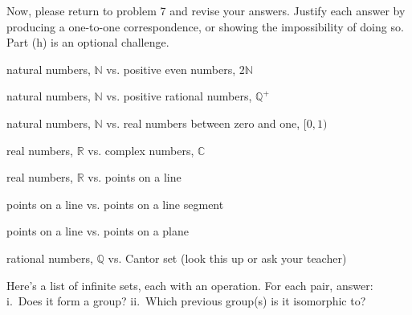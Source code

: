 \documentclass[../gatm_answers.tex]{subfiles}
\begin{document}
\begin{outer_problem}
\item Now, please return to problem 7 and revise your answers. Justify each answer by producing a one-to-one correspondence, or showing the impossibility of doing so. Part (h) is an optional challenge.
\end{outer_problem}

\begin{inner_problem}[start=1]
\item natural numbers, $\mathbb{N}$ vs. positive even numbers, $2\mathbb{N}$
\end{inner_problem}

\begin{inner_problem}
\item natural numbers, $\mathbb{N}$ vs. positive rational numbers, $\mathbb{Q}^+$
\end{inner_problem}

\begin{inner_problem}
\item natural numbers, $\mathbb{N}$ vs. real numbers between zero and one, $[0,1)$
\end{inner_problem}

\begin{inner_problem}
\item real numbers, $\mathbb{R}$ vs. complex numbers, $\mathbb{C}$
\end{inner_problem}

\begin{inner_problem}
\item real numbers, $\mathbb{R}$ vs. points on a line
\end{inner_problem}

\begin{inner_problem}
\item points on a line vs. points on a line segment
\end{inner_problem}

\begin{inner_problem}
\item points on a line vs. points on a plane
\end{inner_problem}

\begin{inner_problem}
\item rational numbers, $\mathbb{Q}$ vs. Cantor set (look this up or ask your teacher)
\end{inner_problem}

\begin{outer_problem}
\item Here’s a list of infinite sets, each with an operation. For each pair, answer: i.~Does it form a group? ii.~Which previous group(s) is it isomorphic to?
\end{outer_problem}
\end{document}
